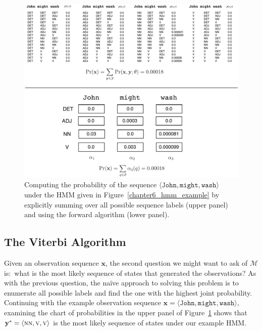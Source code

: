 \begin{figure}
\begin{center}
\vspace{0.2cm}
\includegraphics[scale=0.72]{figures/fig-ch6-q1.pdf}
\vspace{-0.3cm}
\end{center}\caption{Computing the probability of the sequence $\langle \texttt{John} , \texttt{might} , \texttt{wash} \rangle$ under the HMM given in Figure~\ref{chapter6_hmm_example} by explicitly summing over all possible sequence labels (upper panel) and using the forward algorithm (lower panel).}\label{chapter6_fig_question1}
\end{figure}

\subsection{The Viterbi Algorithm}

Given an observation sequence $\mathbf{x}$, the second question we
might want to ask of $\mathcal{M}$ is:\ what is the most likely
sequence of states that generated the observations?  As with the
previous question, the na\"{i}ve approach to solving this problem is
to enumerate all possible labels and find the one with the highest
joint probability.  Continuing with the example observation sequence
$\textbf{x} = \langle \texttt{John} , \texttt{might} , \texttt{wash}
\rangle$, examining the chart of probabilities in the upper panel of
Figure~\ref{chapter6_fig_question1} shows that $\textbf{y}^* = \langle
\textsc{nn}, \textsc{v}, \textsc{v} \rangle$ is the most likely
sequence of states under our example HMM.

